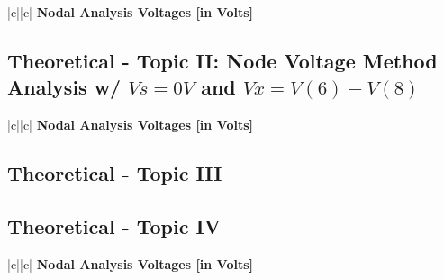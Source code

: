 \begin{center}
   \begin{tabular}{|c||c|}
      \hline    
       {\bf Nodal Analysis Voltages [in Volts]} \\
      \hline
        
   \end{tabular}
 \end{center}


\subsection{Theoretical - Topic II: Node Voltage Method Analysis w/ $Vs=0V$ and $Vx=V(6)-V(8)$}
\label{subsec:second_topic}

\begin{center}
   \begin{tabular}{|c||c|}
      \hline    
       {\bf Nodal Analysis Voltages [in Volts]} \\
      \hline
        
   \end{tabular}
 \end{center}
 
 
\subsection{Theoretical - Topic III}
\label{subsec:third_topic}



 
\subsection{Theoretical - Topic IV}
\label{subsec:fourth_topic}

\begin{center}
   \begin{tabular}{|c||c|}
      \hline    
       {\bf Nodal Analysis Voltages [in Volts]} \\
      \hline
        
   \end{tabular}
 \end{center}
 
